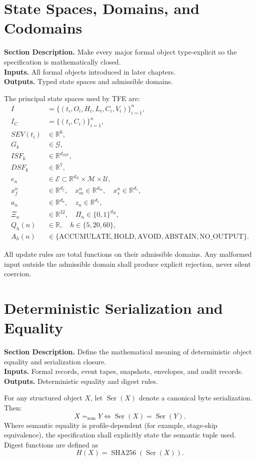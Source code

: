 \documentclass[11pt]{report}
\newcommand{\meta}[3]{\textbf{Section Description.} #1\\
\textbf{Inputs.} #2\\
\textbf{Outputs.} #3\par}
\begin{document}
\section{State Spaces, Domains, and Codomains}
\meta{Make every major formal object type-explicit so the specification is mathematically closed.}{All formal objects introduced in later chapters.}{Typed state spaces and admissible domains.}

The principal state spaces used by TFE are:
\begin{align*}
I &= \{(t_i,O_i,H_i,L_i,C_i,V_i)\}_{i=1}^{n},\\
I_C &= \{(t_i,C_i)\}_{i=1}^{n},\\
SEV(t_i) &\in \mathbb{R}^{6},\\
G_k &\in \mathcal{G},\\
ISF_k &\in \mathbb{R}^{d_{ISF}},\\
DSF_k &\in \mathbb{R}^{7},\\
e_n &\in \mathcal{E}\subset \mathbb{R}^{d_E}\times\mathcal{M}\times\mathcal{U},\\
x_f^n &\in \mathbb{R}^{d_f},\quad x_m^n \in \mathbb{R}^{d_m},\quad x_s^n\in\mathbb{R}^{d_s},\\
a_n &\in \mathbb{R}^{d_a},\quad z_n\in\mathbb{R}^{d_z},\\
\Xi_n &\in \mathbb{R}^{32},\quad \Pi_n\in\{0,1\}^{d_{\Pi}},\\
Q_h(n) &\in \mathbb{R},\quad h\in\{5,20,60\},\\
A_h(n) &\in \{\text{ACCUMULATE},\text{HOLD},\text{AVOID},\text{ABSTAIN},\text{NO\_OUTPUT}\}.
\end{align*}

All update rules are total functions on their admissible domains. Any malformed input outside the admissible domain shall produce explicit rejection, never silent coercion.

\section{Deterministic Serialization and Equality}
\meta{Define the mathematical meaning of deterministic object equality and serialization closure.}{Formal records, event tapes, snapshots, envelopes, and audit records.}{Deterministic equality and digest rules.}

For any structured object $X$, let $\operatorname{Ser}(X)$ denote a canonical byte serialization. Then:
\[
X =_{\mathrm{sem}} Y \iff \operatorname{Ser}(X)=\operatorname{Ser}(Y).
\]
Where semantic equality is profile-dependent (for example, stage-skip equivalence), the specification shall explicitly state the semantic tuple used. Digest functions are defined as
\[
H(X)=\operatorname{SHA256}(\operatorname{Ser}(X)).
\]
\end{document}
